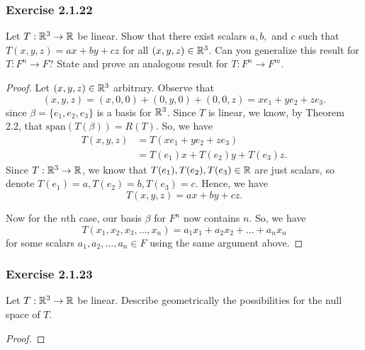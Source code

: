 \subsubsection{Exercise 2.1.22} Let \( T: \mathbb{R}^{3} \to \mathbb{R}  \) be linear. Show that there exist scalars \( a,b,  \) and \( c  \) such that  \( T(x,y,z) = ax + by + cz \) for all \( (x,y,z) \in \mathbb{R}^{3} \). Can you generalize this result for \( T: F^{n} \to F  \)? State and prove an analogous result for \( T: F^{n} \to F^{m} \).
\begin{proof}
Let \( (x,y,z) \in \mathbb{R}^{3} \) arbitrary. Observe that 
\[  (x,y,z) = (x,0,0) + (0,y,0) + (0,0,z) = x e_{1} + y e_{2} + z e_{3}.  \]
since \( \beta = \{ e_{1}, e_{2}, e_{3} \}  \) is a basis for \( \mathbb{R}^{3} \). Since \( T  \) is linear, we know, by Theorem 2.2, that \( \text{span}(T(\beta)) = R(T) \). So, we have
\begin{align*}
    T(x,y,z) &= T( xe_{1} + ye_{2} + ze_{3}) \\
             &= T(e_{1})x + T(e_{2})y  + T(e_{3})z .
\end{align*}
Since \( T: \mathbb{R}^{3} \to \mathbb{R}  \), we know that \( T(e_{1}), T(e_{2}), T(e_{3}) \in \mathbb{R}  \) are just scalars, so denote \( T(e_{1}) = a, T(e_{2}) = b, T(e_{3}) = c  \). Hence, we have
\[  T(x,y,z) = ax + by + cz. \]

Now for the \( n \)th case, our basis \( \beta  \) for \( F^{n} \) now contains \( n \). So, we have
\[  T(x_{1}, x_{2}, x_{3}, \dots, x_{n} ) = a_{1} x_{1} + a_{2} x_{2} + \dots + a_{n} x_{n}   \]
for some scalars \( a_{1}, a_{2}, \dots ,a_{n} \in F  \) using the same argument above.
\end{proof}

\subsubsection{Exercise 2.1.23} Let \( T: \mathbb{R}^{3} \to \mathbb{R}  \) be linear. Describe geometrically the possibilities for the null space of \( T  \). 
\begin{proof}

\end{proof}

